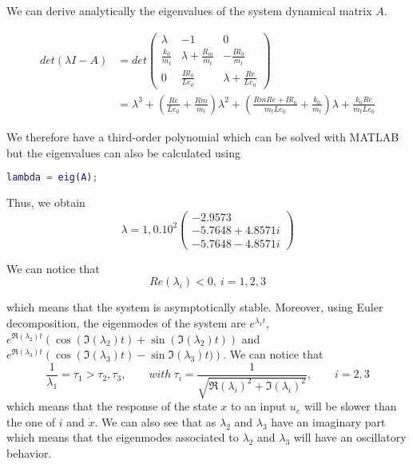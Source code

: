 We can derive analytically the eigenvalues of the system dynamical matrix $A$.

\begin{align}
	\label{eq:eigenValues}
	det(\lambda I-A) & =det\begin{pmatrix}
 \lambda & -1 & 0 \\
  \frac{k_0}{m_t} & \lambda+\frac{R_m}{m_t} & -\frac{Bl_0}{m_t} \\
  0 & \frac{Bl_0}{Le_0} & \lambda+\frac{Re}{Le_0}
\end{pmatrix} \\
& = \lambda^3 +\left(\frac{Re}{Le_0}+\frac{Rm}{m_t}\right)\lambda^2+\left(\frac{RmRe+Bl_0}{m_tLe_0}+\frac{k_0}{m_t}\right)\lambda+\frac{k_0Re}{m_tLe_0}
\end{align}

We therefore have a third-order polynomial which can be solved with MATLAB but the eigenvalues can also be calculated using
\begin{lstlisting}[language=Matlab]
lambda = eig(A);
\end{lstlisting}

Thus, we obtain
\begin{equation}
	\label{eq:eigenValuesValues}
	\lambda = 1,0.10^2\begin{pmatrix}
	-2.9573 \\
	-5.7648 + 4.8571i\\
	-5.7648 - 4.8571i
	\end{pmatrix}
\end{equation}

We can notice that
\begin{equation}
	\label{eq:eigenValuesRe}
	Re(\lambda_i)<0, \ i=1,2,3
\end{equation}

which means that the system is asymptotically stable. Moreover, using Euler decomposition, the eigenmodes of the system are $e^{\lambda_1t}$, $e^{\Re(\lambda_2)t}\left(\cos(\Im(\lambda_2)t)+\sin(\Im(\lambda_2)t)\right)$ and $e^{\Re(\lambda_3)t}\left(\cos(\Im(\lambda_3)t)-\sin\Im(\lambda_3)t)\right)$. We can notice that \begin{equation*}
\frac{1}{\lambda_1}=\tau_1>\tau_2, \tau_3, \qquad with\ \tau_i = \frac{1}{\sqrt{\Re(\lambda_i)^2+\Im(\lambda_i)^2}}, \qquad i = 2, 3
\end{equation*}
which means that the response of the state $x$ to an input $u_e$ will be slower than the one of $i$ and $\dot{x}$. We can also see that as $\lambda_2$ and $\lambda_3$ have an imaginary part which means that the eigenmodes associated to $\lambda_2$ and $\lambda_3$ will have an oscillatory behavior.
